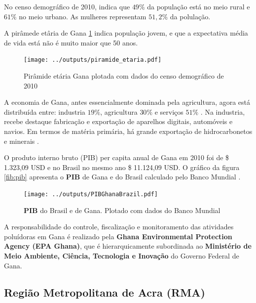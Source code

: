 No censo demográfico de 2010, indica que $49\%$ da população está 
no meio rural e $61\%$ no meio urbano. As mulheres representam 
$51,2\%$ da polulação.

A pirâmede etâria de Gana \ref{fig:piramedegana} indica população jovem, 
e que a expectativa média de vida está não é muito maior que 50 anos. 

\begin{figure}[H]
\begin{center}
  \texttt{[image: ../outputs/piramide\_etaria.pdf]}
  \caption{Pirâmide etária Gana plotada com dados do censo 
           demográfico de 2010 \citep{ghanacensus2013} \label{fig:piramedegana}}
\end{center}
\end{figure}

A economia de Gana, antes essencialmente dominada pela agricultura, 
agora está distribuída entre: industria $19\%$, agricultura $30\%$ 
e serviços $51\%$ \citep{ghanacensus2013}.
Na industria, recebe destaque fabricação e exportação de aparelhos digitais, 
automóveis e navios. Em termos de matéria primária, há grande exportação de 
hidrocarbonetos e minerais \citep{ghanacensus2013}.

O produto interno bruto (PIB) per capita anual de Gana em 2010 foi
de \$ 1.323,09 USD e no Brasil no mesmo ano \$ 11.124,09 USD.
O gráfico da figura \ref{fib:pib} apresenta o \textbf{PIB} de Gana e do Brasil 
calculado pelo Banco Mundial \citep{bancomundial}.

\begin{figure}[H]
\begin{center}
  \texttt{[image: ../outputs/PIBGhanaBrazil.pdf]}
  \caption{\textbf{PIB} do Brasil e de Gana. Plotado com dados do 
           Banco Mundial \citep{bancomundial} \label{fig:pib}}
\end{center}
\end{figure}

A responsabilidade do controle, fiscalização e monitoramento das 
atividades poluídoras em Gana é realizado pela 
\textbf{Ghana Environmental Protection Agency (EPA Ghana)}, que é 
hierarquicamente subordinada ao 
\textbf{Ministério de Meio Ambiente, Ciência, Tecnologia e Inovação} do 
Governo Federal de Gana.

\subsection{Região Metropolitana de Acra \textbf{(RMA)}}

